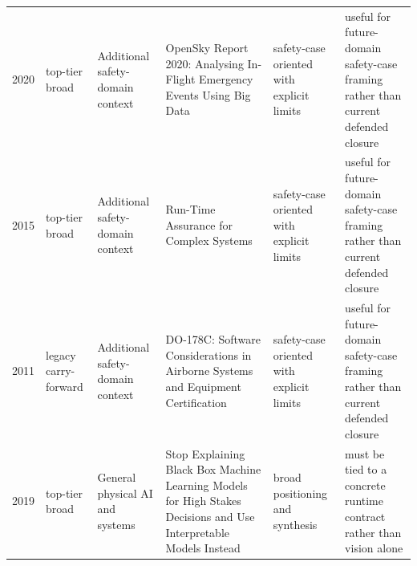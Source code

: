 \begin{longtable}{p{}p{}p{}p{}p{}p{}}
2020 & top-tier broad & Additional safety-domain context & OpenSky Report 2020: Analysing In-Flight Emergency Events Using Big Data & safety-case oriented with explicit limits & useful for future-domain safety-case framing rather than current defended closure\\
2015 & top-tier broad & Additional safety-domain context & Run-Time Assurance for Complex Systems & safety-case oriented with explicit limits & useful for future-domain safety-case framing rather than current defended closure\\
2011 & legacy carry-forward & Additional safety-domain context & DO-178C: Software Considerations in Airborne Systems and Equipment Certification & safety-case oriented with explicit limits & useful for future-domain safety-case framing rather than current defended closure\\
2019 & top-tier broad & General physical AI and systems & Stop Explaining Black Box Machine Learning Models for High Stakes Decisions and Use Interpretable Models Instead & broad positioning and synthesis & must be tied to a concrete runtime contract rather than vision alone\\
\bottomrule
\end{longtable}
